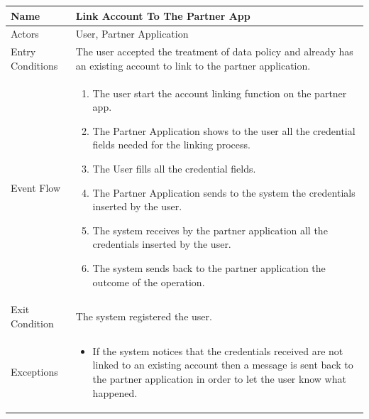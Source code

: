 \begin{enumerate}
\FloatBarrier
\begin{table}[h]
\begin{tabular}{|l|p{}|}
\hline
Name             & Link Account To The Partner App\\ \hline
Actors           & User, Partner Application  \\ \hline
Entry Conditions & The user accepted the treatment of data policy and already has an existing account to link to the partner application.  \\ \hline
Event Flow       & \begin{enumerate}
			\item The user start the account linking function on the partner app.
			\item The Partner Application shows to the user all the credential fields needed for the linking process.
            \item The User fills all the credential fields.
            \item The Partner Application sends to the system the credentials inserted by the user.
            \item The system receives by the partner application all the credentials inserted by the user.
            \item The system sends back to the partner application the outcome of the operation. 
        \end{enumerate}\\ \hline
Exit Condition   & The system registered the user.\\ \hline
Exceptions       & \begin{itemize}
\item If the system notices that the credentials received are not linked to an existing account then a message is sent back to the partner application in order to let the user know what happened.
\end{itemize}\\ \hline
\end{tabular}
\end{table}
\FloatBarrier



\end{enumerate}
